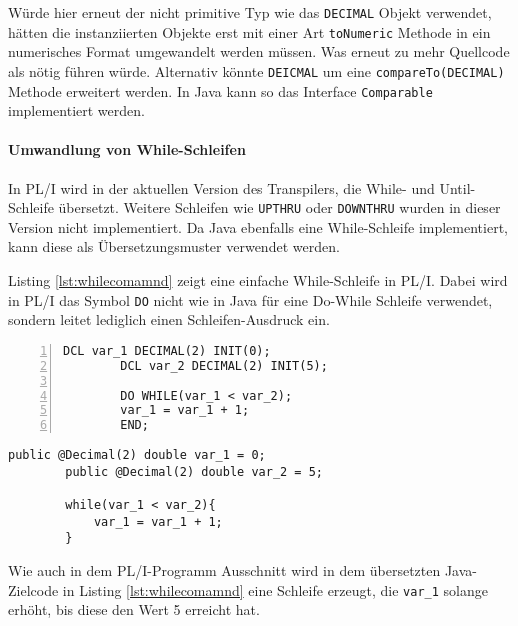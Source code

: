 Würde hier erneut der nicht primitive Typ wie das \verb+DECIMAL+ Objekt verwendet, hätten die instanziierten Objekte erst mit einer Art \verb+toNumeric+ Methode in ein numerisches Format umgewandelt werden müssen. Was erneut zu mehr Quellcode als nötig führen würde. Alternativ könnte \verb+DEICMAL+ um eine \verb+compareTo(DECIMAL)+ Methode erweitert werden. In Java kann so das Interface \verb+Comparable+ implementiert werden. 

\paragraph*{Umwandlung von While-Schleifen}
In PL/I wird in der aktuellen Version des Transpilers, die  While- und Until-Schleife übersetzt.
Weitere Schleifen wie \verb+UPTHRU+ oder \verb+DOWNTHRU+ wurden in dieser Version nicht implementiert.
Da Java ebenfalls eine While-Schleife implementiert, kann diese als Übersetzungsmuster verwendet werden. 


Listing \ref{lst:whilecomamnd} zeigt eine einfache While-Schleife in PL/I.
Dabei wird in PL/I das Symbol \verb+DO+ nicht wie in Java für eine Do-While
Schleife verwendet, sondern leitet lediglich einen Schleifen-Ausdruck ein.

\begin{minipage}[b]{0.48\linewidth}
	\centering
	\lstset{language=PL/I,label=SliceExaple}
	\begin{lstlisting}[frame=single, numbers=left, mathescape,%
		caption={Transformation While-Schleife}, label={lst:whilecomamnd}, basicstyle=\fontsize{9}{13}\selectfont\ttfamily]
		DCL var_1 DECIMAL(2) INIT(0);
		DCL var_2 DECIMAL(2) INIT(5);
		
		DO WHILE(var_1 < var_2);
		var_1 = var_1 + 1;
		END;
	\end{lstlisting}
\end{minipage}
\hspace{0.5cm}
\begin{minipage}[b]{0.48\linewidth}
	\centering
	\lstset{language=Java,label=SliceExaple}
	\begin{lstlisting}[frame=single, mathescape,%
		title={" "}, basicstyle=\fontsize{9}{13}\selectfont\ttfamily]
		public @Decimal(2) double var_1 = 0;
		public @Decimal(2) double var_2 = 5;
		
		while(var_1 < var_2){
			var_1 = var_1 + 1;
		}
	\end{lstlisting}
\end{minipage} 

Wie auch in dem PL/I-Programm Ausschnitt wird in dem übersetzten Java-Zielcode in Listing \ref{lst:whilecomamnd} eine Schleife erzeugt, die \verb+var_1+ solange erhöht, bis diese den Wert 5 erreicht hat.

